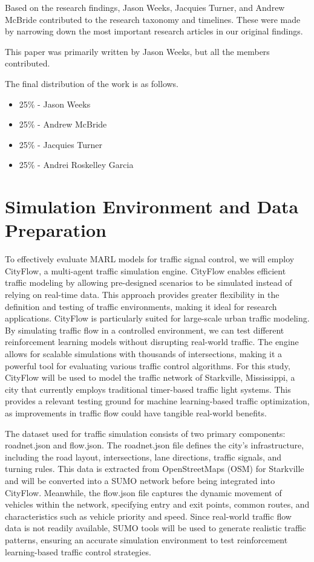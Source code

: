 \documentclass[conference]{IEEEtran}
\begin{document}
Based on the research findings, Jason Weeks, Jacquies Turner, and Andrew McBride contributed to the research taxonomy and timelines. These were made by narrowing down the most important research articles in our original findings.  

This paper was primarily written by Jason Weeks, but all the members contributed. 

The final distribution of the work is as follows. 

\begin{itemize}
    \item 25\% - Jason Weeks
    \item 25\% - Andrew McBride
    \item 25\% - Jacquies Turner
    \item 25\% - Andrei Roskelley Garcia
\end{itemize}


\section{Simulation Environment and Data Preparation}

To effectively evaluate MARL models for traffic signal control, we will employ CityFlow, a multi-agent traffic simulation engine. CityFlow enables efficient traffic modeling by allowing pre-designed scenarios to be simulated instead of relying on real-time data. This approach provides greater flexibility in the definition and testing of traffic environments, making it ideal for research applications. CityFlow is particularly suited for large-scale urban traffic modeling. By simulating traffic flow in a controlled environment, we can test different reinforcement learning models without disrupting real-world traffic. The engine allows for scalable simulations with thousands of intersections, making it a powerful tool for evaluating various traffic control algorithms. For this study, CityFlow will be used to model the traffic network of Starkville, Mississippi, a city that currently employs traditional timer-based traffic light systems. This provides a relevant testing ground for machine learning-based traffic optimization, as improvements in traffic flow could have tangible real-world benefits.

The dataset used for traffic simulation consists of two primary components: roadnet.json and flow.json. The roadnet.json file defines the city's infrastructure, including the road layout, intersections, lane directions, traffic signals, and turning rules. This data is extracted from OpenStreetMaps (OSM) for Starkville and will be converted into a SUMO network before being integrated into CityFlow. Meanwhile, the flow.json file captures the dynamic movement of vehicles within the network, specifying entry and exit points, common routes, and characteristics such as vehicle priority and speed. Since real-world traffic flow data is not readily available, SUMO tools will be used to generate realistic traffic patterns, ensuring an accurate simulation environment to test reinforcement learning-based traffic control strategies.
\end{document}
